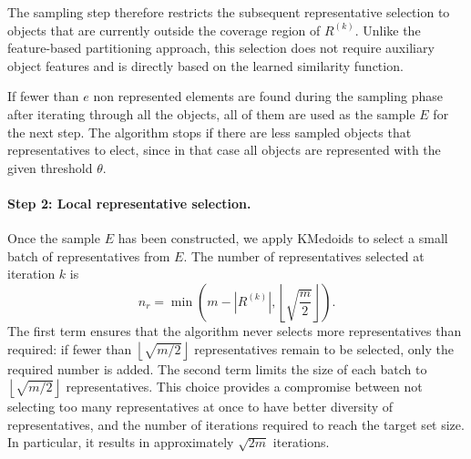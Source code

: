 \documentclass{ieeeaccess}
\newcommand{\toblack}{\color{black}}
\newcommand{\tored}{\color{red}}
\newcommand{\pk}[1]{{\tored [{\bfseries Pierre}: {\itshape #1}] \toblack}}
\newcommand{\representativeamount}{m}
\newcommand{\threshold}{\theta}
\newcommand{\samplesize}{e}
\newcommand{\kmedoidsalg}{KMedoids\xspace}
\begin{document}
The sampling step therefore restricts the subsequent representative
selection to objects that are currently outside the coverage region
of $R^{(k)}$. Unlike the feature-based partitioning approach, this
selection does not require auxiliary object features and is directly
based on the learned similarity function.

If fewer than $\samplesize$ non represented elements are found during the sampling phase after iterating through all the objects, all of them are used as the sample $E$ for the next step. The algorithm stops if there are less sampled objects that representatives to elect, since in that case all objects are represented with the given threshold $\threshold$.


\paragraph*{Step 2: Local representative selection.}

Once the sample $E$ has been constructed, we apply
\kmedoidsalg to select a small batch of representatives from $E$. The
number of representatives selected at iteration $k$ is
\[
n_r =
\min\left(
\representativeamount-|R^{(k)}|,
\left\lfloor
\sqrt{\frac{\representativeamount}{2}}
\right\rfloor
\right).
\]
The first term ensures that the algorithm never selects more representatives than required: if fewer than $\left\lfloor\sqrt{\representativeamount/2}\right\rfloor$ representatives remain to be selected, only the required number is added. 
The second term limits the size of each batch to $\left\lfloor\sqrt{\representativeamount/2}\right\rfloor$ representatives. 
This choice provides a compromise between not selecting too many representatives at once to have better diversity of representatives, and the number of iterations required to reach the target set size. In particular, it results in approximately $\sqrt{2\representativeamount}$ iterations.
\end{document}
